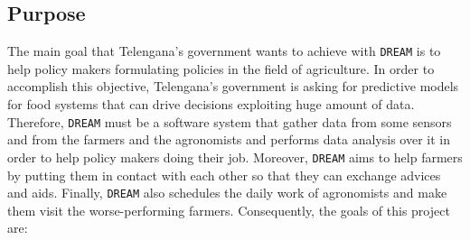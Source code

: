\documentclass{article}
\begin{document}
\subsection{Purpose}
The main goal that Telengana’s government wants to achieve with \verb|DREAM| is to help policy makers 
formulating policies in the field of agriculture. In order to accomplish this objective, Telengana’s 
government is asking for predictive models for food systems that can drive decisions exploiting huge 
amount of data. Therefore, \verb|DREAM| must be a software system that gather data from some sensors and from the farmers and the agronomists and performs data analysis over it in order to help policy makers doing their job. Moreover, \verb|DREAM| aims to help farmers by putting them in contact with each other so that they can exchange advices and aids. Finally, \verb|DREAM| also schedules the daily work of agronomists and make them visit the worse-performing farmers.
Consequently, the goals of this project are:
\end{document}
